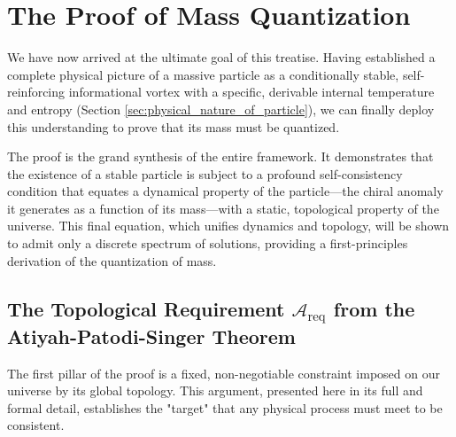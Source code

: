 \documentclass[11pt, letterpaper]{report}
\theoremstyle{plain} %
\theoremstyle{definition} %
\theoremstyle{remark} %
\begin{document}
\section{The Proof of Mass Quantization}
\label{sec:proof_of_mass_quantization}

We have now arrived at the ultimate goal of this treatise. Having established a complete physical picture of a massive particle as a conditionally stable, self-reinforcing informational vortex with a specific, derivable internal temperature and entropy (Section \ref{sec:physical_nature_of_particle}), we can finally deploy this understanding to prove that its mass must be quantized.

The proof is the grand synthesis of the entire framework. It demonstrates that the existence of a stable particle is subject to a profound self-consistency condition that equates a dynamical property of the particle—the chiral anomaly it generates as a function of its mass—with a static, topological property of the universe. This final equation, which unifies dynamics and topology, will be shown to admit only a discrete spectrum of solutions, providing a first-principles derivation of the quantization of mass.

\subsection{The Topological Requirement \texorpdfstring{$\mathcal{A}_{\text{req}}$}{A\_req} from the Atiyah-Patodi-Singer Theorem}
\label{subsec:topological_requirement}

The first pillar of the proof is a fixed, non-negotiable constraint imposed on our universe by its global topology. This argument, presented here in its full and formal detail, establishes the "target" that any physical process must meet to be consistent.
\end{document}
